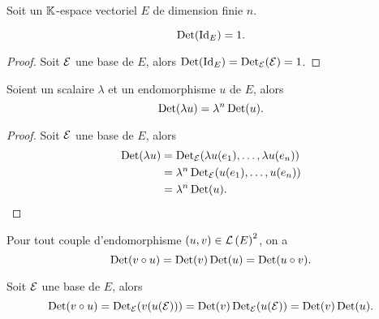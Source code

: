 Soit un $\mathbb{K}$-espace vectoriel $E$ de dimension finie $n$.

\begin{prop}
  \begin{equation}
    \operatorname{Det}(\operatorname{Id}_E) = 1.
  \end{equation}
\end{prop}
\begin{proof}
  Soit $\mathcal{E}$ une base de $E$, alors $\operatorname{Det}(\operatorname{Id}_E)=\operatorname{Det}_{\mathcal{E}}(\mathcal{E})=1$.
\end{proof}
\begin{prop}
  Soient un scalaire $\lambda$ et un endomorphisme $u$ de $E$, alors
  \begin{equation}
    \operatorname{Det}(\lambda u) = \lambda^n \operatorname{Det}(u).
  \end{equation}
\end{prop}
\begin{proof}
  Soit $\mathcal{E}$ une base de $E$, alors
  \begin{align}
    \operatorname{Det}(\lambda u) &= \operatorname{Det}_{\mathcal{E}}(\lambda u(e_1), \ldots, \lambda u(e_n)) \\
    &= \lambda^n \operatorname{Det}_{\mathcal{E}}(u(e_1), \ldots, u(e_n)) \\
    &= \lambda^n \operatorname{Det}(u).
  \end{align}
\end{proof}
\begin{prop}
  Pour tout couple d'endomorphisme $(u,v) \in \mathcal{L}\left(E\right)^2$, on a
  \begin{equation}
    \operatorname{Det}(v \circ u) = \operatorname{Det}(v) \operatorname{Det}(u) = \operatorname{Det}(u \circ v).
  \end{equation}
\end{prop}
\begin{prop}
  Soit $\mathcal{E}$ une base de $E$, alors
  \begin{equation}
    \operatorname{Det}(v \circ u) = \operatorname{Det}_{\mathcal{E}}(v(u(\mathcal{E}))) = \operatorname{Det}(v) \operatorname{Det}_{\mathcal{E}}(u(\mathcal{E})) = \operatorname{Det}(v) \operatorname{Det}(u).
  \end{equation}
\end{prop}
%

